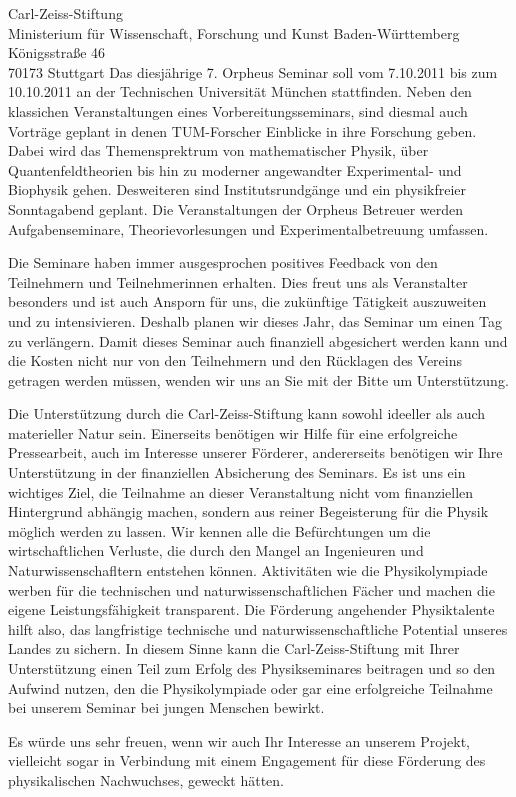 \documentclass[../style/orpheus,fontsize=11pt]{scrlttr2}
\begin{document}
\begin{letter}{
\noindent Carl-Zeiss-Stiftung \\
Ministerium f\"ur Wissenschaft, Forschung und Kunst Baden-W\"urttemberg \\
K\"onigsstra\ss e 46\\
70173 Stuttgart
}
Das diesj\"ahrige 7. Orpheus Seminar soll vom 7.10.2011 bis zum 10.10.2011 an der Technischen Universit\"at M\"unchen stattfinden. Neben den klassichen Veranstaltungen eines Vorbereitungsseminars, sind diesmal auch Vortr\"age geplant in denen TUM-Forscher Einblicke in ihre Forschung geben. Dabei wird das Themensprektrum von mathematischer Physik, \"uber Quantenfeldtheorien bis hin zu moderner angewandter Experimental- und Biophysik gehen.  Desweiteren sind Institutsrundg\"ange und ein physikfreier Sonntagabend geplant.  Die Veranstaltungen der Orpheus Betreuer werden Aufgabenseminare, Theorievorlesungen und Experimentalbetreuung umfassen.  

Die Seminare haben immer ausgesprochen positives Feedback von den Teilnehmern und Teilnehmerinnen erhalten.  Dies freut uns als Veranstalter besonders und ist auch Ansporn f\"ur uns, die zuk\"unftige T\"atigkeit auszuweiten und zu intensivieren.  Deshalb planen wir dieses Jahr, das Seminar um einen Tag zu verl\"angern.  Damit dieses Seminar auch finanziell abgesichert werden kann und die Kosten nicht nur von den Teilnehmern und den R\"ucklagen des Vereins getragen werden m\"ussen, wenden wir uns an Sie mit der Bitte um Unterst\"utzung.

Die Unterst\"utzung durch die Carl-Zeiss-Stiftung kann sowohl ideeller als auch materieller Natur sein.  Einerseits ben\"otigen wir Hilfe f\"ur eine erfolgreiche Pressearbeit, auch im Interesse unserer F\"orderer,  andererseits ben\"otigen wir Ihre Unterst\"utzung in der finanziellen Absicherung des Seminars. Es ist uns ein wichtiges Ziel, die Teilnahme an dieser Veranstaltung nicht vom finanziellen Hintergrund abh\"angig machen, sondern aus reiner Begeisterung f\"ur die Physik m\"oglich werden zu lassen.  Wir kennen alle die Bef\"urchtungen um die wirtschaftlichen Verluste, die durch den Mangel an Ingenieuren und Naturwissenschafltern entstehen k\"onnen. Aktivit\"aten wie die Physikolympiade werben f\"ur die technischen und naturwissenschaftlichen F\"acher und machen die eigene Leistungsf\"ahigkeit transparent. Die F\"orderung angehender Physiktalente hilft also, das langfristige technische und naturwissenschaftliche Potential unseres Landes zu sichern. In diesem Sinne kann die Carl-Zeiss-Stiftung mit Ihrer Unterst\"utzung einen Teil zum Erfolg des Physikseminares beitragen und so den Aufwind nutzen, den die Physikolympiade oder gar eine erfolgreiche Teilnahme bei unserem Seminar bei jungen Menschen bewirkt.

Es w\"urde uns sehr freuen, wenn wir auch Ihr Interesse an unserem Projekt, vielleicht sogar in Verbindung mit einem Engagement f\"ur diese F\"orderung des physikalischen Nachwuchses, geweckt h\"atten.


\end{letter}
\end{document}
